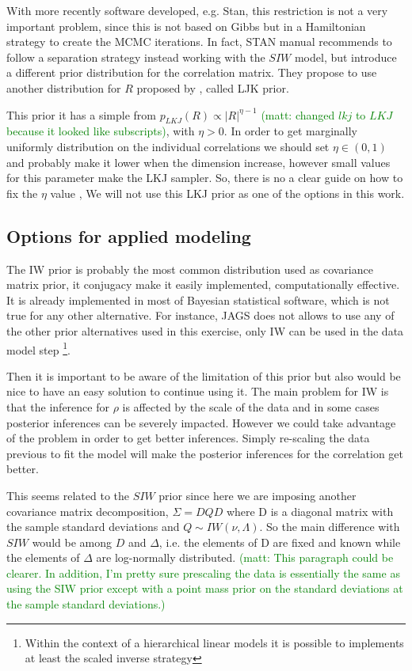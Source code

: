 \documentclass[a4paper]{article}
\newcommand{\matt}[1]{\textcolor{green}{(matt: #1)}}
\begin{document}
With more recently software developed, e.g. Stan, \citep{stan2014} this restriction is not a very important problem, since this is not based on Gibbs but in a Hamiltonian strategy to create the MCMC iterations.  In fact, STAN manual \citep{stanmanual2014} recommends to follow a separation strategy instead working with the $SIW$ model, but introduce a different prior distribution for the correlation matrix. They propose to use another distribution for $R$ proposed by \cite{lewandowski2009generating}, called LJK prior.   

This prior it has a simple from $p_{LKJ}(R) \propto |R|^{\eta-1}$ \matt{changed $lkj$ to $LKJ$ because it looked like subscripts}, with $\eta > 0$. In order to get marginally uniformly distribution on the individual correlations we should  set $\eta \in (0,1)$ and probably make it lower when the dimension increase, however small values for this parameter make the LKJ sampler. So, there is no a clear guide on how to fix the $\eta$ value , We will not use this LKJ prior as one of the options in this work. 

\subsection{Options for applied modeling}

The IW prior is probably the most common distribution used as covariance matrix prior, it conjugacy make it easily implemented, computationally effective. It is already implemented in most of Bayesian statistical software, which is not true for any other alternative. For instance, JAGS does not allows to use any of the other prior alternatives used in this exercise, only IW can be used in the data model step \footnote{Within the context of a hierarchical linear models it is possible to implements at least the scaled inverse strategy}.  

Then it is important to be aware of the limitation of this prior but also would be nice to have an easy solution to continue using it. The main problem for IW is that the inference for $\rho$ is affected by the scale of the data and in some cases posterior inferences can be severely impacted. However we could take advantage of the problem in order to get better inferences. Simply re-scaling the data previous to fit the model will make the posterior inferences for the correlation get better. 

This seems related to the $SIW$ prior since here we are imposing another covariance matrix decomposition, $\Sigma = DQD$ where D is a diagonal matrix with the sample standard deviations and $Q\sim IW(\nu, \Lambda)$. So the main difference with $SIW$ would be among $D$ and $\Delta$, i.e. the elements of D are fixed and known while the elements of $\Delta$ are log-normally distributed. \matt{This paragraph could be clearer. In addition, I'm pretty sure prescaling the data is essentially the same as using the SIW prior except with a point mass prior on the standard deviations at the sample standard deviations.}
\end{document}
